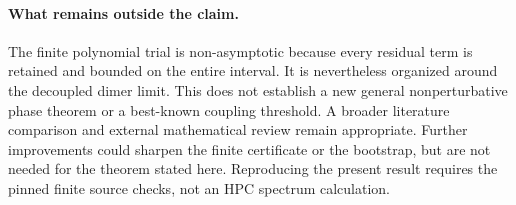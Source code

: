 \paragraph{What remains outside the claim.}
The finite polynomial trial is non-asymptotic because every residual term is
retained and bounded on the entire interval. It is nevertheless organized
around the decoupled dimer limit. This does not establish a new general
nonperturbative phase theorem or a best-known coupling threshold. A broader
literature comparison and external mathematical review remain appropriate.
Further improvements could sharpen the finite certificate or the bootstrap,
but are not needed for the theorem stated here. Reproducing the present result
requires the pinned finite source checks, not an HPC spectrum calculation.
